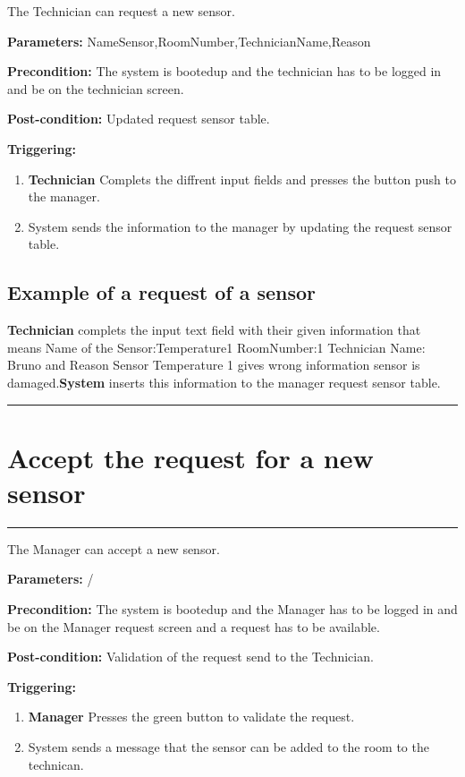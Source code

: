 The Technician can request a new sensor.
\begin{description}
\item \textbf{Parameters:} NameSensor,RoomNumber,TechnicianName,Reason
\item \textbf{Precondition:} The system is bootedup and the technician has to be
logged in and be on the technician screen.
\item \textbf{Post-condition:} Updated request sensor table.

\item \textbf{Triggering:}
\begin{enumerate}
\item \textbf{Technician} Complets the diffrent input fields and presses the
button push to the manager.
\item System sends the information to the manager by updating the request
sensor table.
\end{enumerate}
\end{description}

\subsection{Example of a request of a sensor}
\textbf{Technician} complets the input text field with their given information
that means Name of the Sensor:Temperature1 RoomNumber:1 Technician Name: Bruno
and Reason Sensor Temperature 1 gives wrong information sensor is
damaged.\textbf{System} inserts this information to the manager request sensor
table.
\hfill
\vspace{0.5cm}
\hrule

\section{Accept the request for a new sensor}

\hrule
\hfill
\vspace{0.5cm}

\label{operation:Accept the request for a new sensor}

The Manager can accept a new sensor.
\begin{description}
\item \textbf{Parameters:} /
\item \textbf{Precondition:} The system is bootedup and the Manager has to be
logged in and be on the Manager request screen and a request has to be
available.
\item \textbf{Post-condition:} Validation of the request send to the Technician.

\item \textbf{Triggering:}
\begin{enumerate}
\item \textbf{Manager} Presses the green button to validate the request.
\item System sends a message that the sensor can be added to the room to the
technican.
\end{enumerate}
\end{description}

